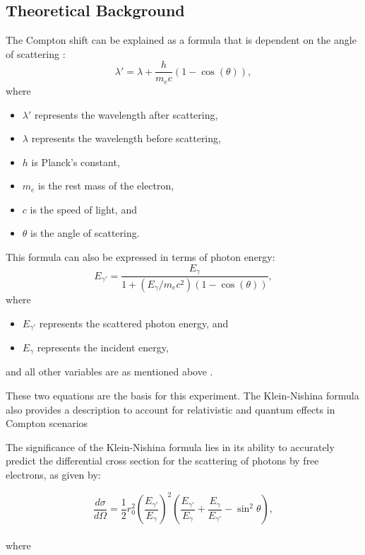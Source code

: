 \documentclass[10pt,letterpaper,onecolumn]{article}
\begin{document}
\subsection{Theoretical Background}
The Compton shift can be explained as a formula that is dependent on the angle of scattering \cite{PhysRev.21.483}:
\begin{equation}
    \label{comptonShiftWavelength} 
    \lambda' = \lambda + \frac{h}{m_e c}(1 - \cos(\theta)),
\end{equation}
where 
\begin{itemize}
\item $\lambda'$ represents the wavelength after scattering, 
\item $\lambda$ represents the wavelength before scattering, 
\item $h$ is Planck's constant,
\item $m_e$ is the rest mass of the electron,
\item $c$ is the speed of light, and
\item $\theta$ is the angle of scattering.
\end{itemize}
This formula can also be expressed in terms of photon energy:
\begin{equation}
    \label{comptonShiftEnergy} 
    E_{\gamma'} = \frac{E_{\gamma}}{1 + \left( {E_{\gamma}}/{m_e c^2} \right)(1 - \cos(\theta))},
\end{equation}
where 
\begin{itemize}
\item $ E_{\gamma'}$ represents the scattered photon energy, and
\item $E_{\gamma}$ represents the incident energy, 
\end{itemize}
and all other variables are as mentioned above
\cite{Taylor2004ModernPhysics}.


These two equations are the basis for this experiment.
The Klein-Nishina formula also provides a description to account for relativistic and quantum effects in Compton scenarios


The significance of the Klein-Nishina formula lies in its ability to accurately predict the differential cross section for the scattering of photons by free electrons, as given by:

\begin{equation}
\frac{d\sigma}{d\Omega} = \frac{1}{2} r_0^2 \left( \frac{E_{\gamma'}}{E_{\gamma}} \right)^2 \left( \frac{E_{\gamma'}}{E_{\gamma}} + \frac{E_{\gamma}}{E_{\gamma'}} - \sin^2 \theta \right),
\end{equation}
\\
where
\end{document}

